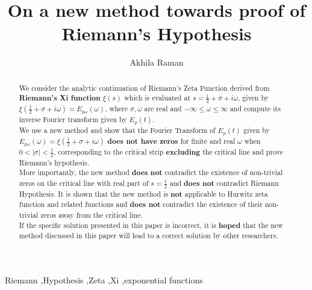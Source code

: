 \documentclass[11pt]{elsarticle}
\begin{document}

\begin{frontmatter}


\title{On a new method towards proof of Riemann's Hypothesis}%


\author{Akhila Raman }

\address{University of California at Berkeley. Email: akhila.raman@berkeley.edu. }




\begin{abstract}

We consider the analytic continuation of Riemann's Zeta Function derived from \textbf{Riemann's Xi function} $\xi(s)$ which is evaluated at $s = \frac{1}{2} + \sigma + i \omega$, given by $\xi(\frac{1}{2} + \sigma + i \omega)= E_{p\omega}(\omega)$, where $\sigma, \omega$ are real and $-\infty \leq \omega \leq \infty$ and compute its inverse Fourier transform given by $E_p(t)$.\\

We use a new method and show that the Fourier Transform of $E_p(t)$ given by $E_{p\omega}(\omega) = \xi(\frac{1}{2} + \sigma + i \omega)$ \textbf{does not have zeros} for finite and real $\omega$ when $0 < |\sigma| < \frac{1}{2}$, corresponding to the critical strip \textbf{excluding} the critical line and prove Riemann's hypothesis.\\

More importantly, the new method \textbf{does not} contradict the existence of non-trivial zeros on the critical line with real part of $s = \frac{1}{2}$ and \textbf{does not} contradict Riemann Hypothesis. It is shown that the new method is \textbf{not} applicable to Hurwitz zeta function and related functions and  \textbf{does not} contradict the existence of their non-trivial zeros away from the critical line. \\

If the specific solution presented in this paper is incorrect, it is \textbf{hoped} that the new method discussed in this paper will lead to a correct solution by other researchers.
\end{abstract}

\begin{keyword}
Riemann \sep Hypothesis \sep Zeta \sep Xi \sep exponential functions



\end{keyword}

\end{frontmatter}
   
\end{document}
